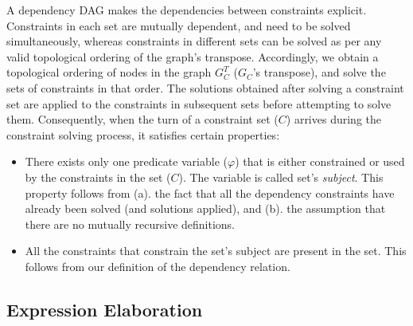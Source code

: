 
A dependency DAG makes the dependencies between constraints explicit.
Constraints in each set are mutually dependent, and need to be solved
simultaneously, whereas constraints in different sets can be solved as
per any valid topological ordering of the graph's transpose.
Accordingly, we obtain a topological ordering of nodes in the graph
$G_{{C}}^{T}$ ($G_C$'s transpose), and solve the sets of constraints
in that order. The solutions obtained after solving a constraint set
are applied to the constraints in subsequent sets before attempting to
solve them.  Consequently, when the turn of a constraint set ($C$)
arrives during the constraint solving process, it satisfies certain
properties:
\begin{itemize}
\item There exists only one predicate variable ($\varphi$) that is either
constrained or used by the constraints in the set ($C$). The variable is
called set's \emph{subject}. This property follows from (a). the fact
that all the dependency constraints have already been solved (and
solutions applied), and (b). the assumption that there are no mutually
recursive definitions. 
\item All the constraints that constrain the set's subject are present
in the set. This follows from our definition of the dependency relation.
\end{itemize}


\subsection{Expression Elaboration}


